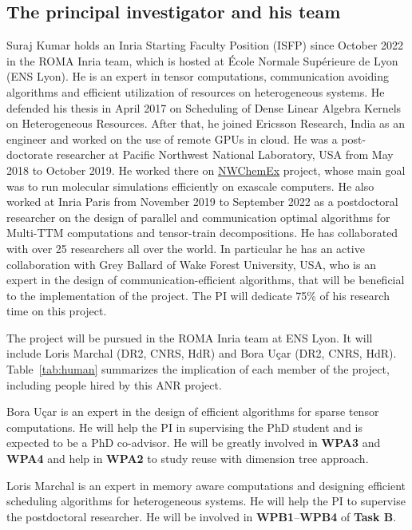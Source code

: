 \documentclass[a4paper,11pt]{article}
\begin{document}
	\vspace*{-0.35cm}\subsection{The principal investigator and his team}
	\label{sec:org:team}
	Suraj Kumar holds an Inria Starting Faculty Position (ISFP) since October 2022 in the ROMA Inria team, which is hosted at École Normale Supérieure de Lyon (ENS Lyon). He is an expert in tensor computations, communication avoiding algorithms and efficient utilization of resources on heterogeneous systems. He defended his thesis in April 2017 on Scheduling of Dense Linear Algebra Kernels on Heterogeneous Resources. After that, he joined Ericsson Research, India as an engineer and worked on the use of remote GPUs in cloud. He was a post-doctorate researcher at Pacific Northwest National Laboratory, USA from May 2018 to October 2019. He worked there on \href{https://www.exascaleproject.org/research-project/nwchemex}{NWChemEx} project, whose main goal was to run molecular simulations efficiently on exascale computers. He also worked at Inria Paris from November 2019 to September 2022 as a postdoctoral researcher on the design of parallel and communication optimal algorithms for Multi-TTM computations and tensor-train decompositions. He has collaborated with over 25 researchers all over the world. In particular he has an active collaboration with Grey Ballard of Wake Forest University, USA, who is an expert in the design of communication-efficient algorithms, that will be beneficial to the implementation of the project. The PI will dedicate 75\% of his research time on this project.
	
	
	
	The project will be pursued in the ROMA Inria team at ENS Lyon. It will include Loris Marchal (DR2, CNRS, HdR) and Bora Uçar (DR2, CNRS, HdR). Table~\ref{tab:human} summarizes the implication of each member of the project, including people hired by this ANR project.
	
		
	Bora Uçar is an expert in the design of efficient algorithms for sparse tensor computations. He will help the PI in supervising the PhD student and is expected to be a PhD co-advisor. He will be greatly involved in \textbf{WPA3} and \textbf{WPA4} and help in \textbf{WPA2} to study reuse with dimension tree approach.
	
	
	Loris Marchal is an expert in memory aware computations and designing efficient scheduling algorithms for heterogeneous systems. He will help the PI to supervise the postdoctoral researcher. He will be involved in \textbf{WPB1}--\textbf{WPB4} of \textbf{Task B}.
	
\end{document}
